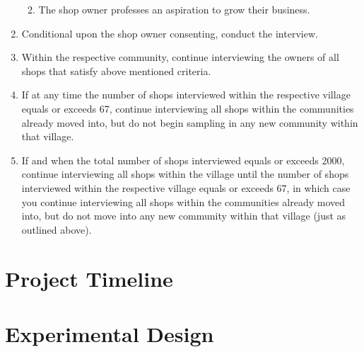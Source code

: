 \documentclass[11.5pt]{article}
\begin{document}
\begin{appendices}
\begin{enumerate}
\begin{enumerate}
\begin{enumerate}
		\end{enumerate}

		\item The shop owner professes an aspiration to grow their business.

	\end{enumerate}

	\item Conditional upon the shop owner consenting, conduct the interview.

	\item Within the respective community, continue interviewing the owners of all 				shops that satisfy above mentioned criteria.

	\item If at any time the number of shops interviewed within the respective 					village equals or exceeds 67, continue interviewing all shops within 				the communities already moved into, but do not begin sampling in any 				new community within that village.

	\item If and when the total number of shops interviewed equals or exceeds 					2000, continue interviewing all shops within the village until the 					number of shops interviewed within the respective village equals or 				exceeds 67, in which case you continue interviewing all shops within 				the communities already moved into, but do not move into any new 					community within that village (just as outlined above).

\end{enumerate}
\pagebreak
\section{Project Timeline} \label{sec.timeline}

\begin{figure}[h]
    \centering
    
\end{figure}

\pagebreak
\section{Experimental Design} \label{sec:design}


\end{appendices}
\end{document}
